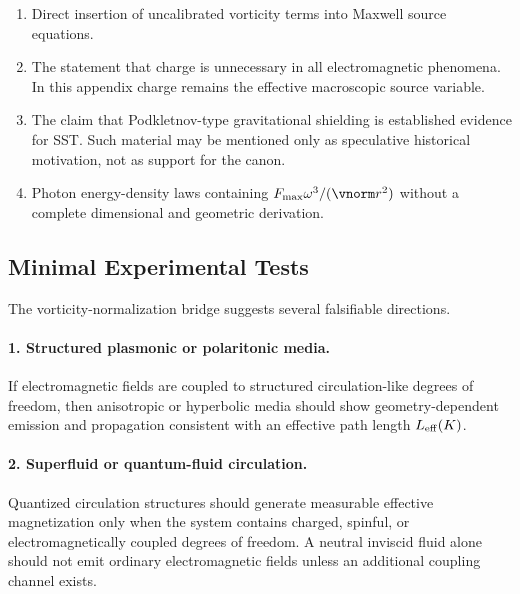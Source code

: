     \begin{enumerate}
        \item Direct insertion of uncalibrated vorticity terms into Maxwell
        source equations.
        
        \item The statement that charge is unnecessary in all electromagnetic
        phenomena.  In this appendix charge remains the effective macroscopic
        source variable.
        
        \item The claim that Podkletnov-type gravitational shielding is
        established evidence for SST.  Such material may be mentioned only as
        speculative historical motivation, not as support for the canon.
        
        \item Photon energy-density laws containing
        \(F_{\max}\omega^3/(\vnorm r^2)\) without a complete dimensional and
        geometric derivation.
    \end{enumerate}

\subsection{Minimal Experimental Tests}
    
    The vorticity-normalization bridge suggests several falsifiable directions.
    
    \paragraph{1. Structured plasmonic or polaritonic media.}
        If electromagnetic fields are coupled to structured circulation-like
        degrees of freedom, then anisotropic or hyperbolic media should show
        geometry-dependent emission and propagation consistent with an effective
        path length \(L_{\rm eff}(K)\).
    
    \paragraph{2. Superfluid or quantum-fluid circulation.}
        Quantized circulation structures should generate measurable effective
        magnetization only when the system contains charged, spinful, or
        electromagnetically coupled degrees of freedom.  A neutral inviscid fluid
        alone should not emit ordinary electromagnetic fields unless an additional
        coupling channel exists.
    
